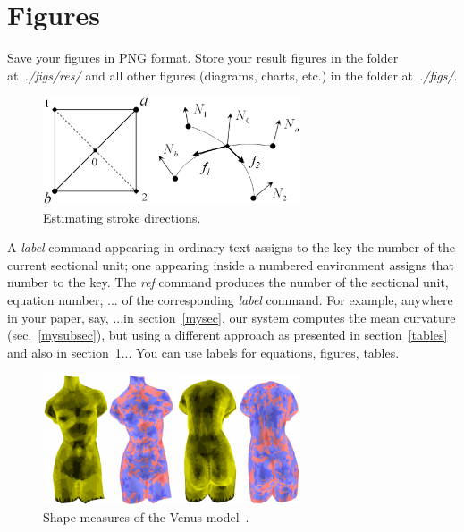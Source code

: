 \documentclass[accepted,single]{gipaper}
\begin{document}

\section{Figures}
\label{figures}

Save your figures in PNG format. Store your result figures in the
folder at~\emph{./figs/res/} and all other figures (diagrams,
charts, etc.) in the folder at~\emph{./figs/}.


\begin{figure}[htpb]
\centering
\includegraphics[width=3in]{figs/diagram.png}
\caption{
    Estimating stroke directions. } \label{fig1}
\end{figure}

A \emph{label} command appearing in ordinary text assigns to the
key the number of the current sectional unit; one appearing inside
a numbered environment assigns that number to the key. The
\emph{ref} command produces the number of the sectional unit,
equation number, ... of the corresponding \emph{label} command.
For example, anywhere in your paper, say, ...in
section~\ref{mysec}, our system computes the mean curvature
(sec.~\ref{mysubsec}), but using a different approach as presented
in section~\ref{tables} and also in section~\ref{figures}... You
can use labels for equations, figures, tables.


\begin{figure}[htpb]
\centering
\includegraphics[width=3in]{figs/venus.png}
\caption{
    Shape measures of the Venus model~\cite{Sousa_etal_CGF:2003}.
} \label{fig1}
\end{figure}
\end{document}
